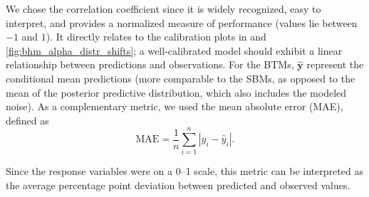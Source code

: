 We chose the correlation coefficient since it is widely recognized, easy to interpret, and provides a normalized measure of performance (values lie between $-1$ and $1$). It directly relates to the calibration plots in  and \ref{fig:bhm_alpha_distr_shifts}; a well-calibrated model should exhibit a linear relationship between predictions and observations. For the BTMs, $\widehat{\mathbf{y}}$ represent the conditional mean predictions (more comparable to the SBMs, as opposed to the mean of the posterior predictive distribution, which also includes the modeled noise). As a complementary metric, we used the mean absolute error (MAE), defined as
\vspace{0.25\baselineskip}
\begin{equation*}
    \text{MAE} = \frac{1}{n} \sum_{i=1}^n \left| y_i - \widehat{y}_i \right|.
\end{equation*}

Since the response variables were on a 0--1 scale, this metric can be interpreted as the average percentage point deviation between predicted and observed values.

